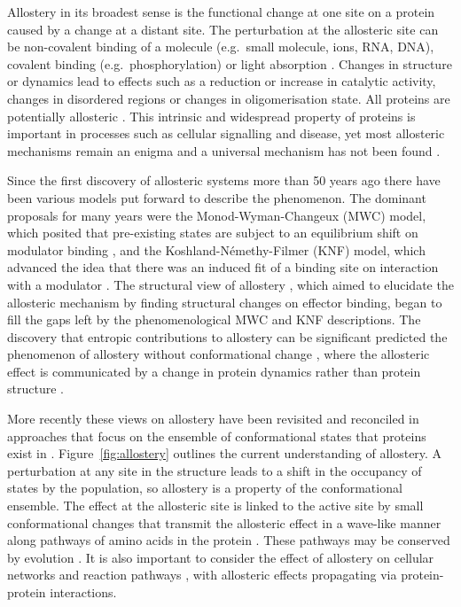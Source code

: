Allostery in its broadest sense is the functional change at one site on a protein caused by a change at a distant site.
The perturbation at the allosteric site can be non-covalent binding of a molecule (e.g.\ small molecule, ions, RNA, DNA), covalent binding (e.g.\ phosphorylation) or light absorption \cite{Nussinov2013}.
Changes in structure or dynamics lead to effects such as a reduction or increase in catalytic activity, changes in disordered regions or changes in oligomerisation state.
All proteins are potentially allosteric \cite{Gunasekaran2004}.
This intrinsic and widespread property of proteins is important in processes such as cellular signalling and disease, yet most allosteric mechanisms remain an enigma and a universal mechanism has not been found \cite{Motlagh2014}.

Since the first discovery of allosteric systems more than 50 years ago there have been various models put forward to describe the phenomenon.
The dominant proposals for many years were the Monod-Wyman-Changeux (MWC) model, which posited that pre-existing states are subject to an equilibrium shift on modulator binding \cite{Monod1965}, and the Koshland-N\'{e}methy-Filmer (KNF) model, which advanced the idea that there was an induced fit of a binding site on interaction with a modulator \cite{Koshland1966}.
The structural view of allostery \cite{Perutz1970}, which aimed to elucidate the allosteric mechanism by finding structural changes on effector binding, began to fill the gaps left by the phenomenological MWC and KNF descriptions.
The discovery that entropic contributions to allostery can be significant predicted the phenomenon of allostery without conformational change \cite{Cooper1984}, where the allosteric effect is communicated by a change in protein dynamics rather than protein structure \cite{Motlagh2014}.

More recently these views on allostery have been revisited and reconciled in approaches that focus on the ensemble of conformational states that proteins exist in \cite{Motlagh2014, Hilser2012, Cui2008, Tsai2014}.
Figure~\ref{fig:allostery} outlines the current understanding of allostery.
A perturbation at any site in the structure leads to a shift in the occupancy of states by the population, so allostery is a property of the conformational ensemble.
The effect at the allosteric site is linked to the active site by small conformational changes that transmit the allosteric effect in a wave-like manner along pathways of amino acids in the protein \cite{DelSol2009}.
These pathways may be conserved by evolution \cite{Suel2003}.
It is also important to consider the effect of allostery on cellular networks and reaction pathways \cite{Nussinov2013}, with allosteric effects propagating via protein-protein interactions.

